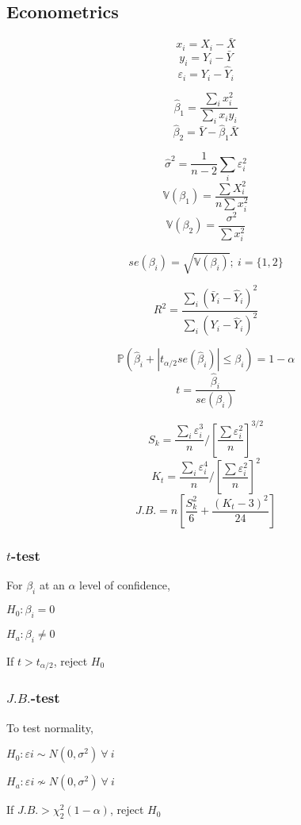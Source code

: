 \documentclass{article}
\begin{document}
\begin{multicols}{2}

\section*{Econometrics}
$$x_i = X_i - \bar X$$
$$y_i = Y_i - \bar Y$$
$$\varepsilon_i = Y_i - \hat Y_i$$

$$\hat \beta_1 = \frac{\sum_i x_i^2}{\sum_i x_i y_i}$$
$$\hat \beta_2 = \bar Y - \hat\beta_1 \bar X$$

$$\hat \sigma^2 = \frac{1}{n-2}\sum_i\varepsilon_i^2$$
$$\mathbb{V}(\beta_1) = \frac{\sum X_i^2}{n\sum x_i^2}$$
$$\mathbb{V}(\beta_2) = \frac{\sigma^2}{\sum x_i^2}$$

$$se(\beta_i) = \sqrt{\mathbb{V}(\beta_i)}; \ i = \{1, 2\}$$

$$R^2 = \frac{\sum_i(\bar Y_i - \hat Y_i)^2}{\sum_i(Y_i - \hat Y_i)^2}$$

$$\mathbb{P}(\hat \beta_i + |t_{\alpha/2} se(\hat\beta_i)| \leq \beta_i) = 1 - \alpha$$
$$t = \frac{\hat \beta_i}{se(\beta_i)}$$

$$S_k = \frac{\sum_i \varepsilon_i^3}{n} / \left[\frac{\sum \varepsilon_i^2}{n}\right] ^ {3/2}$$
$$K_t = \frac{\sum_i \varepsilon_i^4}{n} / \left[\frac{\sum \varepsilon_i^2}{n}\right]^2$$
$$J.B. = n\left[\frac{S_k^2}{6} + \frac{(K_t - 3)^2}{24}\right]$$
\end{multicols}

\hfill \break

\subsubsection*{$t$-test}
For $\beta_i$ at an $\alpha$ level of confidence, 

$H_0: \beta_i = 0$

$H_a: \beta_i \neq 0$

If $t > t_{\alpha/2}$, reject $H_0$

\hfill \break

\subsubsection*{$J.B.$-test}
To test normality,

$H_0: \varepsilon i \sim N(0, \sigma^2) \ \forall \ i$ 

$H_a: \varepsilon i \not \sim N(0, \sigma^2) \ \forall \ i$

If $J.B. > \chi^2_2(1 - \alpha)$, reject $H_0$
\end{document}
